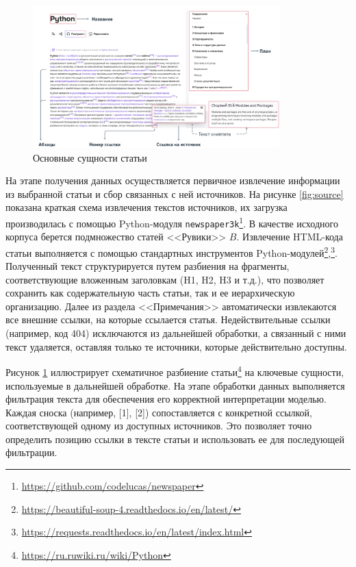 \documentclass{article}
\begin{document}
\begin{figure}[ht!]
  \centering
  \includegraphics[width=0.85\textwidth]{figures/article_entities.png}
  \caption{Основные сущности статьи}
  \label{fig:article}
\end{figure}

На этапе получения данных осуществляется первичное извлечение информации из выбранной статьи и сбор связанных с ней источников. На рисунке \ref{fig:source} показана краткая схема извлечения текстов источников, 
их загрузка производилась с помощью Python-модуля \texttt{newspaper3k}\footnote{\url{https://github.com/codelucas/newspaper}}.
В качестве исходного корпуса берется подмножество статей <<Рувики>> \(B\).
Извлечение HTML-кода статьи выполняется с помощью стандартных инструментов Python-модулей\footnote{\url{https://beautiful-soup-4.readthedocs.io/en/latest/}},\footnote{\url{https://requests.readthedocs.io/en/latest/index.html}}. 
Полученный текст структурируется путем разбиения на фрагменты, соответствующие вложенным заголовкам (H1, H2, H3 и т.д.), что позволяет сохранить как содержательную часть статьи, так и ее иерархическую организацию. 
Далее из раздела <<Примечания>> автоматически извлекаются все внешние ссылки, на которые ссылается статья. Недействительные ссылки (например, код 404) исключаются из дальнейшей обработки,
а связанный с ними текст удаляется, оставляя только те источники, которые действительно доступны.

Рисунок \ref{fig:article} иллюстрирует схематичное разбиение статьи\footnote{\url{https://ru.ruwiki.ru/wiki/Python}} на ключевые сущности, используемые в дальнейшей обработке.
На этапе обработки данных выполняется фильтрация текста для обеспечения его корректной интерпретации моделью. 
Каждая сноска (например, [1], [2]) сопоставляется с конкретной ссылкой, соответствующей одному из доступных источников. 
Это позволяет точно определить позицию ссылки в тексте статьи и использовать ее для последующей фильтрации. 
\end{document}
